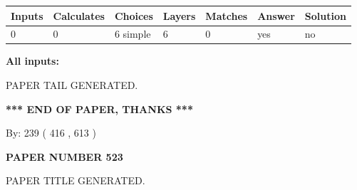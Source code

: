 \documentclass[12pt]{article}
\begin{document}
   
   
   
\noindent\begin{tabular}{|l|l|l|l|l|l|l|}
 \hline
Inputs & Calculates & Choices & Layers & Matches & Answer & Solution \\ \hline
 0  & 
 0  & 
 6
  simple  
  & 
 6  & 
 0  & 
  yes & 
  no 
  \\ \hline
 \end{tabular}
   
   
   
   
\noindent{}
   
   
   
   
\noindent\vspace{0.1in}\hspace{-0.08in} {\textbf{\Large{All inputs: }}}
   
   
   
   
   
   
 \vspace{0.2in}
 
   
   
\vspace{2.0in} PAPER TAIL GENERATED.
   
   
   
   
\vspace{1.0in} 
{\textbf{\large{ *** END OF PAPER, THANKS *** }}} 
   
   
\hspace{1.0in} By: 
 239 ( 416 ,  613 )
   
   
   
   
\newpage 
\setcounter{page}{ 
   523001 } 
   
   
   
   
 {\textbf{ \Large{ PAPER NUMBER  523  }}}
   
   
\vspace{0.2in}
   
   
   
   
   
   
   
   
 \vspace{0.2in}
 
 
 
 
   
   
 PAPER TITLE GENERATED.
   
   
   
\end{document}
